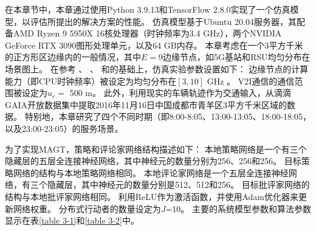在本章节中，本章通过使用Python 3.9.13和TensorFlow 2.8.0实现了一个仿真模型，以评估所提出的解决方案的性能。
仿真模型基于Ubuntu 20.04服务器，其配备AMD Ryzen 9 5950X 16核处理器（时钟频率为3.4 GHz），两个NVIDIA GeForce RTX 3090图形处理单元，以及64 GB内存。
本章考虑在一个3平方千米的正方形区边缘内的一般情况，其中$E=9$边缘节点，如5G基站和RSU均匀分布在场景图上。
在参考 、 、 和的基础上，仿真实验参数设置如下：
边缘节点的计算能力（即CPU时钟频率）被设定为均匀分布在$[3, 10]$ GHz \cite{zhou2019computation}。 
V2I通信的通信范围被设定为$u_e =$ 500 m\cite{zhu2021decentralized}。
此外，利用现实的车辆轨迹作为交通输入，从滴滴GAIA开放数据集中提取2016年11月16日中国成都市青羊区3平方千米区域的数据。
特别地，本章研究了四个不同时期（即8:00-8:05、13:00-13:05、18:00-18:05，以及23:00-23:05）的服务场景。

为了实现MAGT，策略和评论家网络结构描述如下：
本地策略网络是一个有三个隐藏层的五层全连接神经网络，其中神经元的数量分别为256、256和256。
目标策略网络的结构与本地策略网络相同。
本地评论家网络是一个五层全连接神经网络，有三个隐藏层，其中神经元的数量分别是512、512和256。
目标批评家网络的结构与本地批评家网络相同。
利用ReLU作为激活函数，并使用Adam优化器来更新网络权重。
分布式行动者的数量设定为$J$=10。
主要的系统模型参数和算法参数显示在表\ref{table 3-1}和\ref{table 3-2}中。

\begin{table}[h]\small
\centering
{}
\label{table 3-1}
\end{table}

